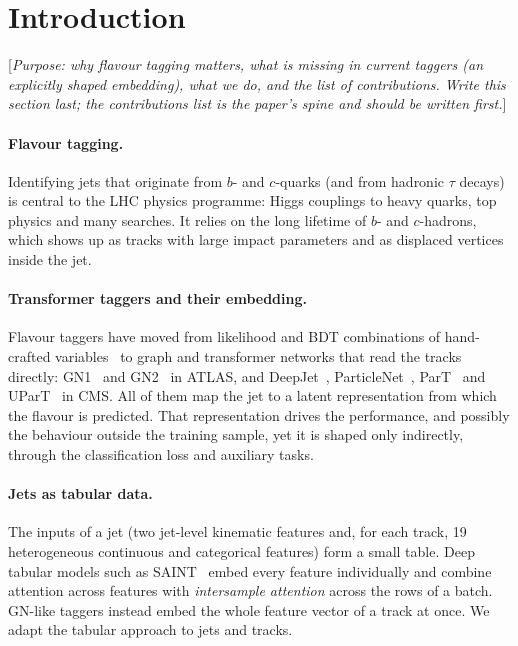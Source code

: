 \documentclass[11pt,a4paper]{article}
\newcommand{\note}[1]{\textcolor{blue!70!black}{[\emph{#1}]}}
\begin{document}
\tableofcontents
\newpage

\section{Introduction}
\label{sec:intro}

\note{Purpose: why flavour tagging matters, what is missing in current taggers (an
explicitly shaped embedding), what we do, and the list of contributions. Write this section
last; the contributions list is the paper's spine and should be written first.}

\paragraph{Flavour tagging.}
Identifying jets that originate from $b$- and $c$-quarks (and from hadronic $\tau$ decays)
is central to the LHC physics programme: Higgs couplings to heavy quarks, top physics and
many searches. It relies on the long lifetime of $b$- and $c$-hadrons, which shows up as
tracks with large impact parameters and as displaced vertices inside the jet.

\paragraph{Transformer taggers and their embedding.}
Flavour taggers have moved from likelihood and BDT combinations of hand-crafted
variables~\citep{ATLAS:2019} to graph and transformer networks that read the tracks
directly: GN1~\citep{GN1} and GN2~\citep{GN2} in ATLAS, and DeepJet~\citep{Bols:2020},
ParticleNet~\citep{Qu_2020}, ParT~\citep{Qu:2022} and UParT~\citep{CMSDP2025081} in CMS.
All of them map the jet to a latent representation from which the flavour is predicted.
That representation drives the performance, and possibly the behaviour outside the
training sample, yet it is shaped only indirectly, through the classification loss and
auxiliary tasks.

\paragraph{Jets as tabular data.}
The inputs of a jet (two jet-level kinematic features and, for each track, 19 heterogeneous
continuous and categorical features) form a small table. Deep tabular models such as
SAINT~\citep{somepalli2021saint} embed every feature individually and combine attention
across features with \emph{intersample attention} across the rows of a batch. GN-like
taggers instead embed the whole feature vector of a track at once. We adapt the tabular
approach to jets and tracks.
\end{document}
